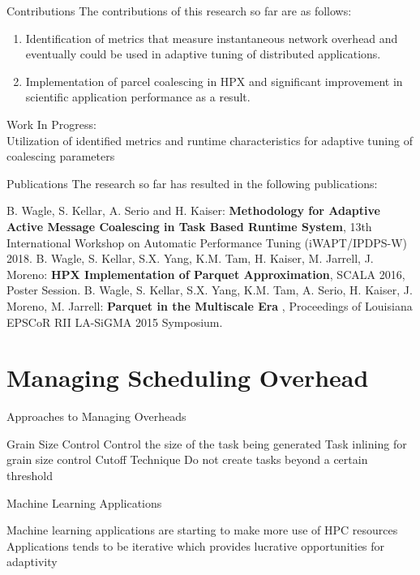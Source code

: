 \documentclass[10pt]{beamer}
\begin{document}
\begin{frame}{Contributions}
The contributions  of this research so far are as follows: 
\begin{enumerate}
	\item Identification of metrics that measure instantaneous network overhead and eventually could be used in adaptive tuning of distributed applications. 
	\item Implementation of parcel coalescing in HPX and significant improvement in scientific application performance as a result. 
\end{enumerate}
\alert{Work In Progress:} \\
Utilization of identified metrics and runtime characteristics for adaptive tuning of coalescing parameters 
\end{frame}

\begin{frame}{Publications}
The research so far has resulted in the following publications: 
\begin{outline}
	\1 B. Wagle, S. Kellar, A. Serio and H. Kaiser:\textbf{ Methodology for Adaptive Active Message Coalescing in Task Based Runtime System}, 13th International Workshop on Automatic Performance Tuning (iWAPT/IPDPS-W) 2018.
	\1 B. Wagle, S. Kellar, S.X. Yang, K.M. Tam, H. Kaiser, M. Jarrell, J. Moreno: \textbf{HPX Implementation of Parquet Approximation}, SCALA 2016, Poster Session.
	\1 B. Wagle, S. Kellar, S.X. Yang, K.M. Tam, A. Serio, H. Kaiser, J. Moreno, M. Jarrell: \textbf{Parquet in the Multiscale Era} , Proceedings of Louisiana EPSCoR RII LA-SiGMA 2015 Symposium.
\end{outline}
\end{frame}

\section{Managing Scheduling Overhead}

\begin{frame}{Approaches to Managing Overheads}
\begin{outline}
	\1 Grain Size Control 
		\2 Control the size of the task being generated 
		\2 Task inlining for grain size control
	\1 Cutoff Technique
		\2 Do not create tasks beyond a certain threshold
\end{outline}	
\end{frame}

\begin{frame}{Machine Learning Applications}
\begin{outline}
	\1 Machine learning applications are starting to make more use of HPC resources
	\1 Applications tends to be iterative which provides lucrative opportunities for adaptivity
\end{outline}
\end{frame}
\end{document}
